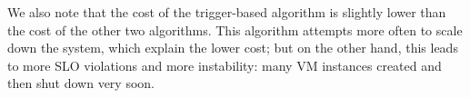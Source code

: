 We also note that the cost of the trigger-based algorithm is slightly
lower than the cost of the other two algorithms. This algorithm
attempts more often to scale down the system, which explain the lower cost;
but on the other hand, this leads to more SLO violations and more
instability: many VM instances created and then shut down very soon. 




	

